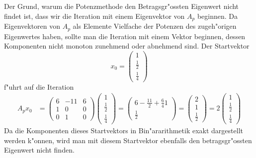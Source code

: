 \begin{loesung}
Der Grund, warum die Potenzmethode den Betragsgr"ossten Eigenwert nicht 
findet ist, dass wir die Iteration mit einem Eigenvektor von $A_p$
beginnen.
Da Eigenvektoren von $A_p$ als Elemente Vielfache der Potenzen des
zugeh"origen Eigenwertes haben, sollte man die Iteration mit einem
Vektor beginnen, dessen Komponenten nicht monoton zunehmend oder
abnehmend sind. Der Startvektor
\[
x_0=\begin{pmatrix}1\\\frac12\\\frac14\end{pmatrix}
\]
f"uhrt auf die Iteration
\begin{align*}
A_px_0
&=
\begin{pmatrix}
6&-11&6\\
1&  0&0\\
0&  1&0
\end{pmatrix}
\begin{pmatrix}1\\\frac12\\\frac14\end{pmatrix}
=
\begin{pmatrix}
6-\frac{11}2+\frac64
1\\
\frac12
\end{pmatrix}
=
\begin{pmatrix}
2\\
1\\
\frac12
\end{pmatrix}
=2
\begin{pmatrix}1\\\frac12\\\frac14\end{pmatrix}
\end{align*}
Da die Komponenten dieses Startvektors in Bin"ararithmetik exakt
dargestellt werden k"onnen, wird man mit diesem Startvektor ebenfalls
den betragsgr"ossten Eigenwert nicht finden.


\end{loesung}
